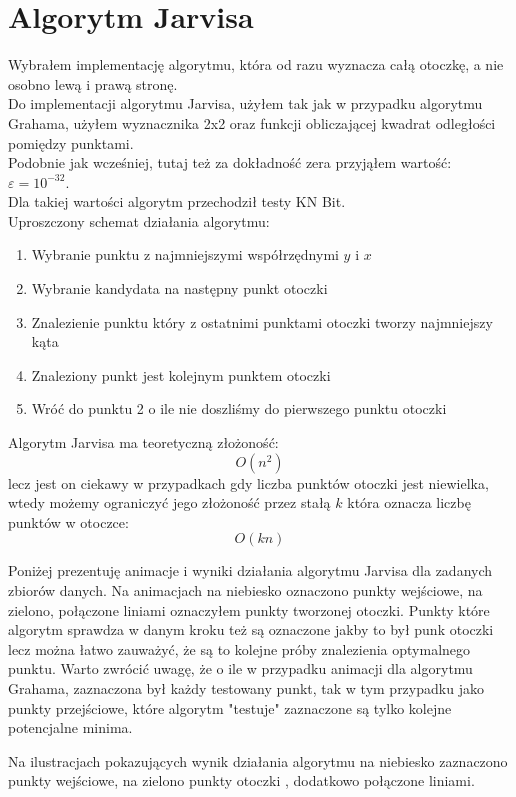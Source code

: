\documentclass[a4paper]{article}
\begin{document}
\section{Algorytm Jarvisa}
Wybrałem implementację algorytmu, która od razu wyznacza całą otoczkę, a nie osobno lewą i prawą stronę.\\
Do implementacji algorytmu Jarvisa, użyłem tak jak w przypadku algorytmu Grahama, użyłem wyznacznika 2x2 oraz
funkcji obliczającej kwadrat odległości pomiędzy punktami.\\
Podobnie jak wcześniej, tutaj też za dokładność zera przyjąłem wartość: $\varepsilon = 10^{-32}$.\\
Dla takiej wartości algorytm przechodził testy KN Bit.\\

Uproszczony schemat działania algorytmu:
\begin{enumerate}
    \item Wybranie punktu z najmniejszymi współrzędnymi $y$ i $x$
    \item Wybranie kandydata na następny punkt otoczki
    \item Znalezienie punktu który z ostatnimi punktami otoczki tworzy najmniejszy kąta
    \item Znaleziony punkt jest kolejnym punktem otoczki
    \item Wróć do punktu 2 o ile nie doszliśmy do pierwszego punktu otoczki
\end{enumerate}

Algorytm Jarvisa ma teoretyczną złożoność: 
\[O(n^2)\]
lecz jest on ciekawy w przypadkach gdy liczba punktów otoczki jest niewielka, wtedy
możemy ograniczyć jego złożoność przez stałą $k$ która oznacza liczbę punktów w otoczce:
\[O(kn)\]

Poniżej prezentuję animacje i wyniki działania algorytmu Jarvisa dla zadanych zbiorów danych.
Na animacjach na niebiesko oznaczono punkty wejściowe, na zielono, połączone liniami oznaczyłem punkty
tworzonej otoczki. Punkty które algorytm sprawdza w danym kroku też są oznaczone jakby to był punk otoczki
lecz można łatwo zauważyć, że są to kolejne próby znalezienia optymalnego punktu. Warto zwrócić uwagę,
że o ile w przypadku animacji dla algorytmu Grahama, zaznaczona był każdy testowany punkt, tak w tym przypadku
jako punkty przejściowe, które algorytm "testuje" zaznaczone są tylko kolejne potencjalne minima.

Na ilustracjach pokazujących wynik działania algorytmu na niebiesko zaznaczono punkty wejściowe, na zielono punkty otoczki
, dodatkowo połączone liniami.
\end{document}
